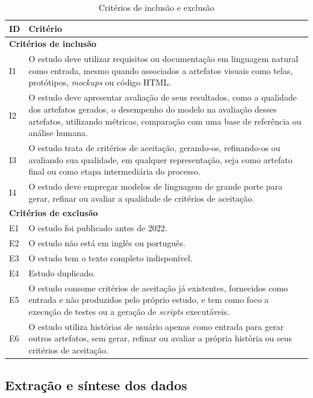 \begin{table}[H]
  \centering
  \caption{Critérios de inclusão e exclusão}
  \label{tab:criterios}
  \small
  \begin{tabular}{|p{}|p{}|}
    \hline
    \textbf{ID} & \textbf{Critério} \\ \hline
    \multicolumn{2}{|l|}{\textbf{Critérios de inclusão}} \\ \hline
    I1 & O estudo deve utilizar requisitos ou documentação em linguagem natural como entrada, mesmo quando associados a artefatos visuais como telas, protótipos, \textit{mockups} ou código HTML. \\ \hline
    I2 & O estudo deve apresentar avaliação de seus resultados, como a qualidade dos artefatos gerados, o desempenho do modelo na avaliação desses artefatos, utilizando métricas, comparação com uma base de referência ou análise humana. \\ \hline
    I3 & O estudo trata de critérios de aceitação, gerando-os, refinando-os ou avaliando sua qualidade, em qualquer representação, seja como artefato final ou como etapa intermediária do processo. \\ \hline
    I4 & O estudo deve empregar modelos de linguagem de grande porte para gerar, refinar ou avaliar a qualidade de critérios de aceitação. \\ \hline
    \multicolumn{2}{|l|}{\textbf{Critérios de exclusão}} \\ \hline
    E1 & O estudo foi publicado antes de 2022. \\ \hline
    E2 & O estudo não está em inglês ou português. \\ \hline
    E3 & O estudo tem o texto completo indisponível. \\ \hline
    E4 & Estudo duplicado. \\ \hline
    E5 & O estudo consome critérios de aceitação já existentes, fornecidos como entrada e não produzidos pelo próprio estudo, e tem como foco a execução de testes ou a geração de \textit{scripts} executáveis. \\ \hline
    E6 & O estudo utiliza histórias de usuário apenas como entrada para gerar outros artefatos, sem gerar, refinar ou avaliar a própria história ou seus critérios de aceitação. \\ \hline
  \end{tabular}
\end{table}

\subsection{Extração e síntese dos dados}
\label{sec:extracao}

